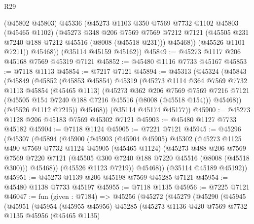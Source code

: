 \begin{lexlean}{R29}
\begin{coremodule}
            (@45802 @45803)
            @45336
            (@45273
              @1103
              @350
              @7569
              @7732
              @1102
              @45803
              (@45465 @1102)
              (@45273
                @348
                @206
                @7569
                @7569
                @7212
                @7121
                (@45505 @231 @7240 @188 @7212 @45516 (@8008 (@45518 @231)))
                @45468))
            (@45526 @1101 @7211))
          @45468))
      (@35114 @45159 @45162))
@45849 := @45273 @1117 @206 @45168 @7569 @45319 @7121
@45852 := @45480 @1116 @7733 @45167
@45853 := @7118 @1113
@45854 := @7217 @7121
@45894 := @45313
    (@45324
      (@45843
        (@45849
          (@45852
            (@45853 @45854)
            @45319
            (@45273
              @1114
              @364
              @7569
              @7732
              @1113
              @45854
              (@45465 @1113)
              (@45273
                @362
                @206
                @7569
                @7569
                @7216
                @7121
                (@45505 @154 @7240 @188 @7216 @45516 (@8008 (@45518 @154)))
                @45468))
            (@45526 @1112 @7215))
          @45468))
      (@35114 @45174 @45177))
@45900 := @45273 @1128 @206 @45183 @7569 @45302 @7121
@45903 := @45480 @1127 @7733 @45182
@45904 := @7118 @1124
@45905 := @7221 @7121
@45945 := @45296
    (@45307
      (@45894
        (@45900
          (@45903
            (@45904 @45905)
            @45302
            (@45273
              @1125
              @490
              @7569
              @7732
              @1124
              @45905
              (@45465 @1124)
              (@45273
                @488
                @206
                @7569
                @7569
                @7220
                @7121
                (@45505 @300 @7240 @188 @7220 @45516 (@8008 (@45518 @300)))
                @45468))
            (@45526 @1123 @7219))
          @45468))
      (@35114 @45189 @45192))
@45951 := @45273 @1139 @206 @45198 @7569 @45285 @7121
@45954 := @45480 @1138 @7733 @45197
@45955 := @7118 @1135
@45956 := @7225 @7121
@46047 := fun (given : @7184) =>
  @45256
    (@45272
      (@45279
        (@45290
          (@45945
            (@45951
              (@45954
                (@45955 @45956)
                @45285
                (@45273
                  @1136
                  @420
                  @7569
                  @7732
                  @1135
                  @45956
                  (@45465 @1135)

\end{coremodule}
\end{lexlean}

